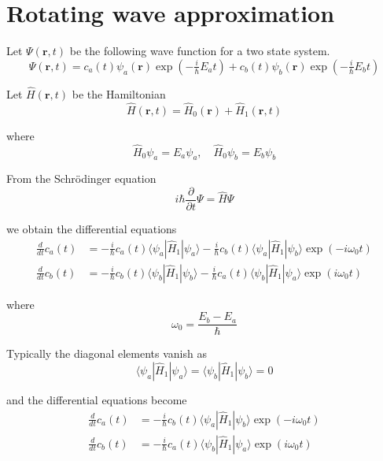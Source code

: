 

\section*{Rotating wave approximation}

Let $\Psi(\mathbf r,t)$ be the following wave function for a two state system.
\begin{equation*}
\Psi(\mathbf r,t)
=c_a(t)\psi_a(\mathbf r)\exp\left(-\tfrac{i}{\hbar}E_at\right)
+c_b(t)\psi_b(\mathbf r)\exp\left(-\tfrac{i}{\hbar}E_bt\right)
\end{equation*}

Let $\hat H(\mathbf r,t)$ be the Hamiltonian
\begin{equation*}
\hat H(\mathbf r,t)=\hat H_0(\mathbf r)+\hat H_1(\mathbf r,t)
\end{equation*}

where
\begin{equation*}
\hat H_0\psi_a=E_a\psi_a,\quad\hat H_0\psi_b=E_b\psi_b
\end{equation*}

From the Schr\"odinger equation
\begin{equation*}
i\hbar\frac{\partial}{\partial t}\Psi=\hat H\Psi
\end{equation*}

we obtain the differential equations
\begin{equation*}
\begin{aligned}
\frac{d}{dt}c_a(t)&=-\frac{i}{\hbar}c_a(t)\langle\psi_a|\hat H_1|\psi_a\rangle
-\frac{i}{\hbar}c_b(t)\langle\psi_a|\hat H_1|\psi_b\rangle\exp(-i\omega_0t)
\\[1ex]
\frac{d}{dt}c_b(t)&=-\frac{i}{\hbar}c_b(t)\langle\psi_b|\hat H_1|\psi_b\rangle
-\frac{i}{\hbar}c_a(t)\langle\psi_b|\hat H_1|\psi_a\rangle\exp(i\omega_0t)
\end{aligned}
\end{equation*}

where
\begin{equation*}
\omega_0=\frac{E_b-E_a}{\hbar}
\end{equation*}

Typically the diagonal elements vanish as
\begin{equation*}
\langle\psi_a|\hat H_1|\psi_a\rangle=\langle\psi_b|\hat H_1|\psi_b\rangle=0
\end{equation*}

and the differential equations become
\begin{align*}
\frac{d}{dt}c_a(t)&=-\frac{i}{\hbar}c_b(t)\langle\psi_a|\hat H_1|\psi_b\rangle\exp(-i\omega_0t)
\tag{1}
\\[1ex]
\frac{d}{dt}c_b(t)&=-\frac{i}{\hbar}c_a(t)\langle\psi_b|\hat H_1|\psi_a\rangle\exp(i\omega_0t)
\tag{2}
\end{align*}

